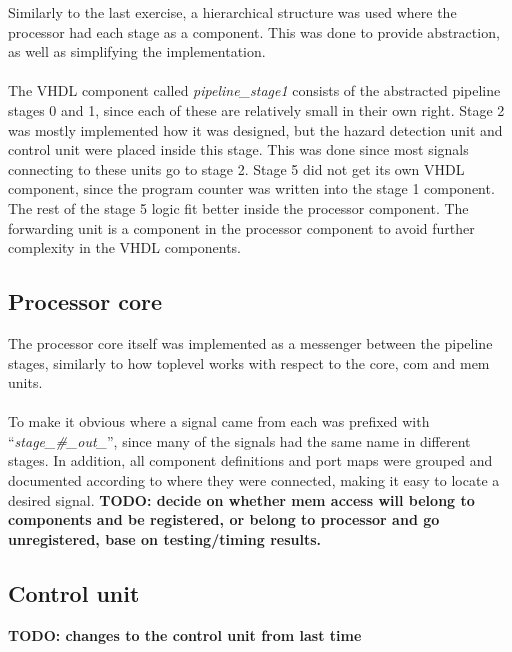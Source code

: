 Similarly to the last exercise, a hierarchical structure was used where the
processor had each stage as a component. This was done to provide abstraction,
as well as simplifying the implementation.
\paragraph*{}
The VHDL component called \emph{pipeline\_stage1} consists of the abstracted
pipeline stages 0 and 1, since each of these are relatively small in their own
right. Stage 2 was mostly implemented how it was designed, but the hazard
detection unit and control unit were placed inside this stage. This was done
since most signals connecting to these units go to stage 2. Stage 5 did not get
its own VHDL component, since the program counter was written into the stage 1
component. The rest of the stage 5 logic fit better inside the processor
component. The forwarding unit is a component in the processor component to
avoid further complexity in the VHDL components.

\subsection{Processor core}
The processor core itself was implemented as a messenger between the pipeline
stages, similarly to how toplevel works with respect to the core, com and mem
units.
\paragraph*{}
To make it obvious where a signal came from each was prefixed with
``\emph{stage\_\#\_out\_}'', since many of the signals had the same name in
different stages. In addition, all component definitions and port maps were
grouped and documented according to where they were connected, making it easy to
locate a desired signal.\newline
\textbf{TODO: decide on whether mem access will belong to components and be registered, or belong to processor and go unregistered, base on testing/timing results.}

\subsection{Control unit}
\textbf{TODO: changes to the control unit from last time}
